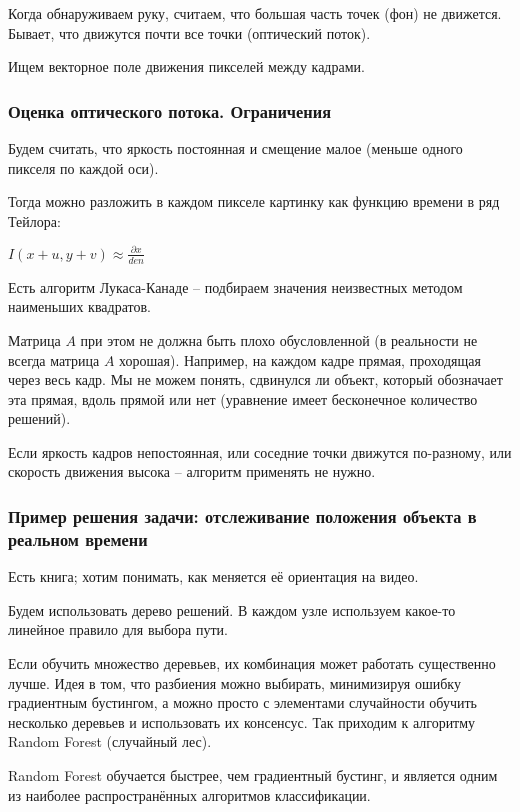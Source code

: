 \documentclass[main.tex]{subfiles}
\begin{document}
Когда обнаруживаем руку, считаем, что большая часть точек (фон) не движется.
Бывает, что движутся почти все точки (оптический поток).

Ищем векторное поле движения пикселей между кадрами.

\subsubsection{ Оценка оптического потока. Ограничения }

Будем считать, что яркость постоянная и смещение малое (меньше одного пикселя по каждой оси).

Тогда можно разложить в каждом пикселе картинку как функцию времени в ряд Тейлора:

$ I(x + u, y + v) \approx \frac{\partial x}{den} $ %

Есть алгоритм Лукаса-Канаде -- подбираем значения неизвестных методом наименьших квадратов.

Матрица $ A $ при этом не должна быть плохо обусловленной (в реальности не всегда матрица $ A $ хорошая).
Например, на каждом кадре прямая, проходящая через весь кадр.
Мы не можем понять, сдвинулся ли объект, который обозначает эта прямая, вдоль прямой или нет (уравнение имеет бесконечное количество решений).

Если яркость кадров непостоянная, или соседние точки движутся по-разному, или скорость движения высока -- алгоритм применять не нужно.

\subsubsection{Пример решения задачи: отслеживание положения объекта в реальном времени}

Есть книга; хотим понимать, как меняется её ориентация на видео.

Будем использовать дерево решений.
В каждом узле используем какое-то линейное правило для выбора пути.

Если обучить множество деревьев, их комбинация может работать существенно лучше.
Идея в том, что разбиения можно выбирать, минимизируя ошибку градиентным бустингом, а можно просто с элементами случайности обучить несколько деревьев и использовать их консенсус. Так приходим к алгоритму Random Forest (случайный лес).

Random Forest обучается быстрее, чем градиентный бустинг, и является одним из наиболее распространённых алгоритмов классификации. \\
\end{document}
